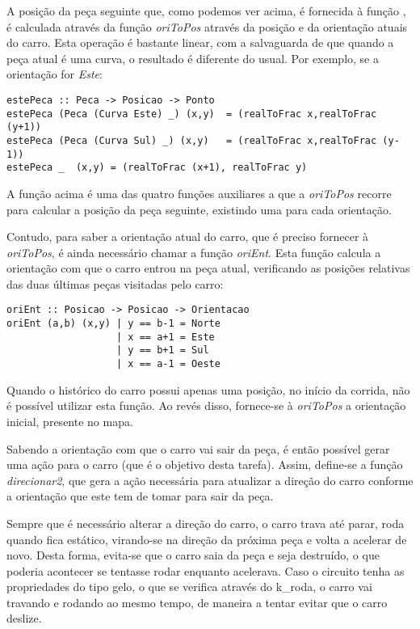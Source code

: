 \documentclass[a4paper]{report}
\begin{document}
A posição da peça seguinte que, como podemos ver acima, é fornecida à função , é calculada através da função \textit{oriToPos} através da posição e da orientação atuais do carro. Esta operação é bastante linear, com a salvaguarda de que quando a peça atual é uma curva, o resultado é diferente do usual. Por exemplo, se a orientação for \textit{Este}:

\begin{verbatim}
estePeca :: Peca -> Posicao -> Ponto
estePeca (Peca (Curva Este) _) (x,y)  = (realToFrac x,realToFrac (y+1))
estePeca (Peca (Curva Sul) _) (x,y)   = (realToFrac x,realToFrac (y-1))
estePeca _  (x,y) = (realToFrac (x+1), realToFrac y)
\end{verbatim}

A função acima é uma das quatro funções auxiliares a que a \textit{oriToPos} recorre para calcular a posição da peça seguinte, existindo uma para cada orientação.

Contudo, para saber a orientação atual do carro, que é preciso fornecer à \textit{oriToPos}, é ainda necessário chamar a função \textit{oriEnt}. Esta função calcula a orientação com que o carro entrou na peça atual, verificando as posições relativas das duas últimas peças visitadas pelo carro:

\begin{verbatim}
oriEnt :: Posicao -> Posicao -> Orientacao
oriEnt (a,b) (x,y) | y == b-1 = Norte
                   | x == a+1 = Este
                   | y == b+1 = Sul
                   | x == a-1 = Oeste
\end{verbatim}

Quando o histórico do carro possui apenas uma posição, no início da corrida, não é possível utilizar esta função. Ao revés disso, fornece-se à \textit{oriToPos} a orientação inicial, presente no mapa.

Sabendo a orientação com que o carro vai sair da peça, é então possível gerar uma ação para o carro (que é o objetivo desta tarefa). Assim, define-se a função \textit{direcionar2}, que gera a ação necessária para atualizar a direção do carro conforme a orientação que este tem de tomar para sair da peça.

Sempre que é necessário alterar a direção do carro, o carro trava até parar, roda quando fica estático, virando-se na direção da próxima peça e volta a acelerar de novo. Desta forma, evita-se que o carro saia da peça e seja destruído, o que poderia acontecer se tentasse rodar enquanto acelerava. Caso o circuito tenha as propriedades do tipo gelo, o que se verifica através do k\_roda, o carro vai travando e rodando ao mesmo tempo, de maneira a tentar evitar que o carro deslize.
\end{document}
